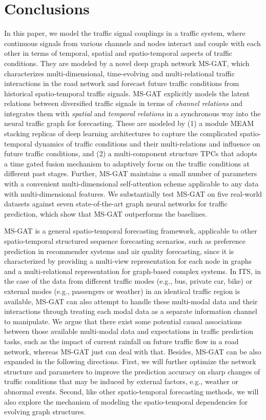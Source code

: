\section{Conclusions}
In this paper, we model the traffic signal couplings in a traffic system, where continuous signals from various channels and nodes interact and couple with each other in terms of temporal, spatial and spatio-temporal aspects of traffic conditions. They are modeled by a novel deep graph network MS-GAT, which characterizes multi-dimensional, time-evolving and multi-relational traffic interactions in the road network and forecast future traffic conditions from historical spatio-temporal traffic signals. MS-GAT explicitly models the latent relations between diversified traffic signals in terms of \textit{channel relations} and integrates them  with \textit{spatial} and \textit{temporal relations} in a synchronous way into the neural traffic graph for forecasting. These are modeled by (1) a module MEAM stacking replicas of deep learning architectures to capture the complicated spatio-temporal dynamics of traffic conditions and their multi-relations and influence on future traffic conditions, and (2) a multi-component structure TPCs that adopts a time gated fusion mechanism to adaptively focus on the traffic conditions at different past stages. Further, MS-GAT maintains a small number of parameters with a convenient multi-dimensional self-attention scheme applicable to any data with multi-dimensional features. We substantially test MS-GAT on five real-world datasets against seven state-of-the-art graph neural networks for traffic prediction, which show that MS-GAT outperforms the baselines. 

MS-GAT is a general spatio-temporal forecasting framework, applicable to other spatio-temporal structured sequence forecasting scenarios, such as preference prediction in recommender systems and air quality forecasting, since it is characterized by providing a multi-view representation for each node in graphs and a multi-relational representation for graph-based complex systems. In ITS, in the case of the data from different traffic modes (e.g., bus, private car, bike) or external modes (e.g., passengers or weather) in an identical traffic region is available, MS-GAT can also attempt to handle these multi-modal data and their interactions through treating each modal data as a separate information channel to manipulate. We argue that there exist some potential causal associations between those available multi-modal data and expectations in traffic prediction tasks, such as the impact of current rainfall on future traffic flow in a road network, whereas MS-GAT just can deal with that. Besides, MS-GAT can be also expanded in the following directions. First, we will further optimize the network structure and parameters to improve the prediction accuracy on sharp changes of traffic conditions that may be induced by external factors, e.g., weather or abnormal events. Second, like other spatio-temporal forecasting methods, we will also explore the mechanism of modeling the spatio-temporal dependencies for evolving graph structures.